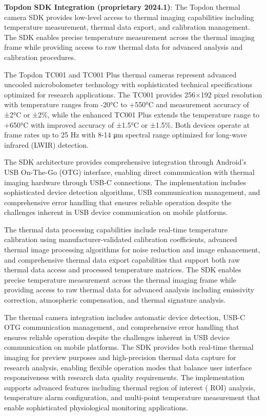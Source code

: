\documentclass[11pt,a4paper]{article}
\begin{document}
\textbf{Topdon SDK Integration (proprietary 2024.1)}: The Topdon thermal camera SDK provides low-level access to thermal
imaging capabilities including temperature measurement, thermal data export, and calibration management. The SDK enables
precise temperature measurement across the thermal imaging frame while providing access to raw thermal data for advanced
analysis and calibration procedures.

The Topdon TC001 and TC001 Plus thermal cameras represent advanced uncooled microbolometer technology with sophisticated
technical specifications optimized for research applications. The TC001 provides 256×192 pixel resolution with
temperature ranges from -20°C to +550°C and measurement accuracy of ±2°C or ±2\%, while the enhanced TC001 Plus extends
the temperature range to +650°C with improved accuracy of ±1.5°C or ±1.5\%. Both devices operate at frame rates up to 25
Hz with 8-14 μm spectral range optimized for long-wave infrared (LWIR) detection.

The SDK architecture provides comprehensive integration through Android's USB On-The-Go (OTG) interface, enabling direct
communication with thermal imaging hardware through USB-C connections. The implementation includes sophisticated device
detection algorithms, USB communication management, and comprehensive error handling that ensures reliable operation
despite the challenges inherent in USB device communication on mobile platforms.

The thermal data processing capabilities include real-time temperature calibration using manufacturer-validated
calibration coefficients, advanced thermal image processing algorithms for noise reduction and image enhancement, and
comprehensive thermal data export capabilities that support both raw thermal data access and processed temperature
matrices. The SDK enables precise temperature measurement across the thermal imaging frame while providing access to raw
thermal data for advanced analysis including emissivity correction, atmospheric compensation, and thermal signature
analysis.

The thermal camera integration includes automatic device detection, USB-C OTG communication management, and
comprehensive error handling that ensures reliable operation despite the challenges inherent in USB device communication
on mobile platforms. The SDK provides both real-time thermal imaging for preview purposes and high-precision thermal
data capture for research analysis, enabling flexible operation modes that balance user interface responsiveness with
research data quality requirements. The implementation supports advanced features including thermal region of interest (
ROI) analysis, temperature alarm configuration, and multi-point temperature measurement that enable sophisticated
physiological monitoring applications.
\end{document}
